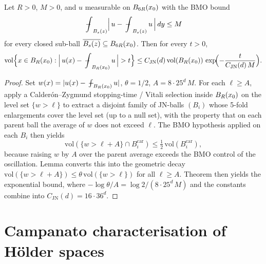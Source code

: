\begin{theorem}
\label{thm:john_nirenberg_local}
\leanok
{}
Let $R > 0$, $M > 0$, and $u$ measurable on $B_{6R}(x_0)$ with the BMO bound
\begin{equation*}
\fint_{\Ball{s}{z}} \Bigl|\, u - \fint_{\Ball{s}{z}} u\, \Bigr|\, dy \le M
\end{equation*}
for every closed sub-ball $\overline{B_{s}(z)} \subseteq B_{6R}(x_0)$. Then for every
$t > 0$,
\begin{equation*}
\mathrm{vol}\Bigl\{ x \in \Ball{R}{x_0} : \Bigl|\,u(x) - \fint_{\Ball{R}{x_0}} u\,\Bigr| > t\Bigr\}
\le C_{\mathrm{JN}}(d)\, \mathrm{vol}(\Ball{R}{x_0})\,
\exp\!\Bigl(-\frac{t}{C_{\mathrm{JN}}(d)\,M}\Bigr).
\end{equation*}
\end{theorem}
\begin{proof}
\leanok
{}

Set $w(x) = |u(x) - \fint_{\Ball{R}{x_0}} u|$, $\theta = 1/2$, $A = 8\cdot 25^{d}\, M$.
For each $\ell \ge A$, apply a Calder\'on--Zygmund stopping-time / Vitali selection
inside $B_{R}(x_0)$ on the level set $\{w > \ell\}$ to extract a disjoint family of
JN-balls $(B_i)$ whose 5-fold enlargements cover the level set (up to a null set), with
the property that on each parent ball the average of $w$ does not exceed $\ell$. The
BMO hypothesis applied on each $B_i$ then yields
\begin{equation*}
\mathrm{vol}(\{w > \ell + A\}\cap B_i^{\mathrm{car}})
\le \tfrac{1}{2}\, \mathrm{vol}(B_i^{\mathrm{car}}),
\end{equation*}
because raising $w$ by $A$ over the parent average exceeds the BMO control of the
oscillation. Lemma  converts this into the
geometric decay $\mathrm{vol}(\{w > \ell + A\}) \le \theta\, \mathrm{vol}(\{w > \ell\})$ for
all $\ell \ge A$. Theorem  then yields the
exponential bound, where $-\log\theta/A = \log 2 / (8\cdot 25^{d}\, M)$ and the
constants combine into $C_{\mathrm{JN}}(d) = 16\cdot 36^{d}$.
\end{proof}

\section{Campanato characterisation of H\"older spaces}

